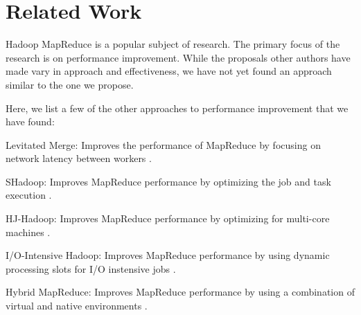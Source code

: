 \section{Related Work}
\label{section:relatedwork}
Hadoop MapReduce is a popular subject of research. The primary focus of the research
is on performance improvement. While the proposals other authors have made vary in
approach and effectiveness, we have not yet found an approach similar to the one
we propose.

Here, we list a few of the other approaches to performance improvement that we have found:
\begin{description}
  \item{Levitated Merge:} Improves the performance of MapReduce by focusing on network latency between workers \cite{LevitatedMerge}.
  \item{SHadoop:} Improves MapReduce performance by optimizing the job and task execution \cite{SHadoop}.
  \item{HJ-Hadoop:} Improves MapReduce performance by optimizing for multi-core machines \cite{HJHadoop}.
  \item{I/O-Intensive Hadoop:} Improves MapReduce performance by using dynamic processing slots for I/O instensive jobs \cite{IOIntensive}.
  \item{Hybrid MapReduce:} Improves MapReduce performance by using a combination of virtual and native environments \cite{HybricMR}.
\end{description}
